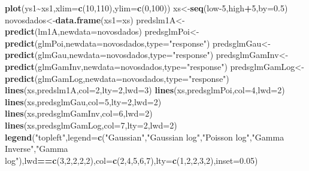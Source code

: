 \documentclass[
]{book}
\newenvironment{Shaded}{\begin{snugshade}}{\end{snugshade}}
\newcommand{\AttributeTok}[1]{\textcolor[rgb]{0.13,0.29,0.53}{#1}}
\newcommand{\DecValTok}[1]{\textcolor[rgb]{0.00,0.00,0.81}{#1}}
\newcommand{\FloatTok}[1]{\textcolor[rgb]{0.00,0.00,0.81}{#1}}
\newcommand{\FunctionTok}[1]{\textcolor[rgb]{0.13,0.29,0.53}{\textbf{#1}}}
\newcommand{\NormalTok}[1]{#1}
\newcommand{\OtherTok}[1]{\textcolor[rgb]{0.56,0.35,0.01}{#1}}
\newcommand{\SpecialCharTok}[1]{\textcolor[rgb]{0.81,0.36,0.00}{\textbf{#1}}}
\newcommand{\StringTok}[1]{\textcolor[rgb]{0.31,0.60,0.02}{#1}}
\begin{document}
\begin{Shaded}
\begin{Highlighting}[]
\FunctionTok{plot}\NormalTok{(ys1}\SpecialCharTok{\textasciitilde{}}\NormalTok{xs1,}\AttributeTok{xlim=}\FunctionTok{c}\NormalTok{(}\DecValTok{10}\NormalTok{,}\DecValTok{110}\NormalTok{),}\AttributeTok{ylim=}\FunctionTok{c}\NormalTok{(}\DecValTok{0}\NormalTok{,}\DecValTok{100}\NormalTok{))}
\NormalTok{xs}\OtherTok{\textless{}{-}}\FunctionTok{seq}\NormalTok{(low}\DecValTok{{-}5}\NormalTok{,high}\SpecialCharTok{+}\DecValTok{5}\NormalTok{,}\AttributeTok{by=}\FloatTok{0.5}\NormalTok{)}
\NormalTok{novosdados}\OtherTok{\textless{}{-}}\FunctionTok{data.frame}\NormalTok{(}\AttributeTok{xs1=}\NormalTok{xs)}
\NormalTok{predslm1A}\OtherTok{\textless{}{-}}\FunctionTok{predict}\NormalTok{(lm1A,}\AttributeTok{newdata=}\NormalTok{novosdados)}
\NormalTok{predsglmPoi}\OtherTok{\textless{}{-}}\FunctionTok{predict}\NormalTok{(glmPoi,}\AttributeTok{newdata=}\NormalTok{novosdados,}\AttributeTok{type=}\StringTok{"response"}\NormalTok{)}
\NormalTok{predsglmGau}\OtherTok{\textless{}{-}}\FunctionTok{predict}\NormalTok{(glmGau,}\AttributeTok{newdata=}\NormalTok{novosdados,}\AttributeTok{type=}\StringTok{"response"}\NormalTok{)}
\NormalTok{predsglmGamInv}\OtherTok{\textless{}{-}}\FunctionTok{predict}\NormalTok{(glmGamInv,}\AttributeTok{newdata=}\NormalTok{novosdados,}\AttributeTok{type=}\StringTok{"response"}\NormalTok{)}
\NormalTok{predsglmGamLog}\OtherTok{\textless{}{-}}\FunctionTok{predict}\NormalTok{(glmGamLog,}\AttributeTok{newdata=}\NormalTok{novosdados,}\AttributeTok{type=}\StringTok{"response"}\NormalTok{)}
\FunctionTok{lines}\NormalTok{(xs,predslm1A,}\AttributeTok{col=}\DecValTok{2}\NormalTok{,}\AttributeTok{lty=}\DecValTok{2}\NormalTok{,}\AttributeTok{lwd=}\DecValTok{3}\NormalTok{)}
\FunctionTok{lines}\NormalTok{(xs,predsglmPoi,}\AttributeTok{col=}\DecValTok{4}\NormalTok{,}\AttributeTok{lwd=}\DecValTok{2}\NormalTok{)}
\FunctionTok{lines}\NormalTok{(xs,predsglmGau,}\AttributeTok{col=}\DecValTok{5}\NormalTok{,}\AttributeTok{lty=}\DecValTok{2}\NormalTok{,}\AttributeTok{lwd=}\DecValTok{2}\NormalTok{)}
\FunctionTok{lines}\NormalTok{(xs,predsglmGamInv,}\AttributeTok{col=}\DecValTok{6}\NormalTok{,}\AttributeTok{lwd=}\DecValTok{2}\NormalTok{)}
\FunctionTok{lines}\NormalTok{(xs,predsglmGamLog,}\AttributeTok{col=}\DecValTok{7}\NormalTok{,}\AttributeTok{lty=}\DecValTok{2}\NormalTok{,}\AttributeTok{lwd=}\DecValTok{2}\NormalTok{)}
\FunctionTok{legend}\NormalTok{(}\StringTok{"topleft"}\NormalTok{,}\AttributeTok{legend=}\FunctionTok{c}\NormalTok{(}\StringTok{"Gaussian"}\NormalTok{,}\StringTok{"Gaussian log"}\NormalTok{,}\StringTok{"Poisson log"}\NormalTok{,}\StringTok{"Gamma Inverse"}\NormalTok{,}\StringTok{"Gamma log"}\NormalTok{),lwd}\SpecialCharTok{==}\FunctionTok{c}\NormalTok{(}\DecValTok{3}\NormalTok{,}\DecValTok{2}\NormalTok{,}\DecValTok{2}\NormalTok{,}\DecValTok{2}\NormalTok{,}\DecValTok{2}\NormalTok{),}\AttributeTok{col=}\FunctionTok{c}\NormalTok{(}\DecValTok{2}\NormalTok{,}\DecValTok{4}\NormalTok{,}\DecValTok{5}\NormalTok{,}\DecValTok{6}\NormalTok{,}\DecValTok{7}\NormalTok{),}\AttributeTok{lty=}\FunctionTok{c}\NormalTok{(}\DecValTok{1}\NormalTok{,}\DecValTok{2}\NormalTok{,}\DecValTok{2}\NormalTok{,}\DecValTok{3}\NormalTok{,}\DecValTok{2}\NormalTok{),}\AttributeTok{inset=}\FloatTok{0.05}\NormalTok{)}

\end{Highlighting}
\end{Shaded}
\end{document}
